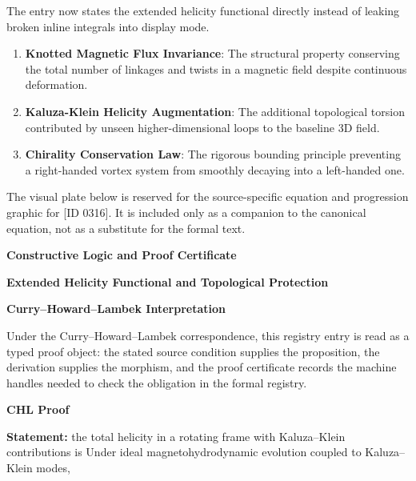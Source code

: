 The entry now states the extended helicity functional directly instead of leaking broken inline integrals into display mode.
\endgroup

\begin{enumerate}[leftmargin=1.6em,itemsep=6pt,topsep=4pt]
\item \textbf{Knotted Magnetic Flux Invariance}: The structural property conserving the total number of linkages and twists in a magnetic field despite continuous deformation.
\item \textbf{Kaluza-Klein Helicity Augmentation}: The additional topological torsion contributed by unseen higher-dimensional loops to the baseline 3D field.
\item \textbf{Chirality Conservation Law}: The rigorous bounding principle preventing a right-handed vortex system from smoothly decaying into a left-handed one.
\end{enumerate}

\begingroup\footnotesize\sloppy
The visual plate below is reserved for the source-specific equation and progression graphic for [ID 0316]. It is included only as a companion to the canonical equation, not as a substitute for the formal text.
\par\endgroup
\ifTZPDarkEdition
{}
\fi

\clearpage
\begingroup\tzpsupportsetup
\noindent\textbf{\fontsize{10.8pt}{12.8pt}\selectfont [ID 0316] Constructive Logic and Proof Certificate}\par
\noindent\textbf{\fontsize{10pt}{12pt}\selectfont Extended Helicity Functional and Topological Protection}\par
\vspace{0.45em}
\begingroup
\footnotesize
\setlength{\parskip}{0.22em}
\setlength{\parindent}{0pt}
\noindent\textbf{Curry--Howard--Lambek Interpretation}\par
Under the Curry--Howard--Lambek correspondence, this registry entry is read as a typed proof
object: the stated source condition supplies the proposition, the derivation supplies the
morphism, and the proof certificate records the machine handles needed to check the obligation
in the formal registry.

\vspace{0.45em}
\noindent\textbf{CHL Proof}\par
\textbf{Statement:} the total helicity in a rotating frame with Kaluza--Klein contributions is Under ideal
magnetohydrodynamic evolution coupled to Kaluza--Klein modes,

